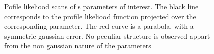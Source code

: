 \begin{figure}[h]
  \centering
  \begin{subfigure}{0.5\textwidth}
    \scalebox{0.60}{}
    \caption{}
    \label{nll_ACP0}
  \end{subfigure}%
  \hfill%
  \begin{subfigure}{0.5\textwidth}
    \scalebox{0.60}{}
    \caption{}
    \label{nll_ACPperp}
  \end{subfigure}
  \begin{subfigure}{0.5\textwidth}
    \scalebox{0.60}{}
    \caption{}
    \label{nll_ACPpar}
  \end{subfigure}%
  \hfill%
  \begin{subfigure}{0.5\textwidth}
    \scalebox{0.60}{}
    \caption{}
    \label{nll_ACPS}
  \end{subfigure}
\caption{Pofile likeliood scans of \Acp{} parameters of interest. The black line corresponds to the profile likeliood
         function projected over the corresponding parameter. The red curve is a parabola, with a symmetric gaussian 
         error. No peculiar structure is observed appart from the non gaussian nature of the parameters}
\end{figure}

\clearpage

